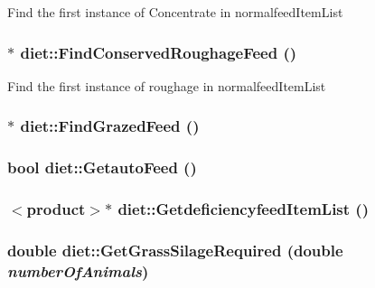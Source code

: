 \label{classdiet_a4ea8bc5fea836aedba836343ab6b5376}
Find the first instance of Concentrate in normalfeedItemList \hypertarget{classdiet_ade50672d858563540e1589b857c6d4fb}{
\subsubsection[{FindConservedRoughageFeed}]{ $\ast$ diet::FindConservedRoughageFeed ()}}
\label{classdiet_ade50672d858563540e1589b857c6d4fb}
Find the first instance of roughage in normalfeedItemList \hypertarget{classdiet_af057336f6bb49b8d919fcf4d9379d584}{
\subsubsection[{FindGrazedFeed}]{ $\ast$ diet::FindGrazedFeed ()}}
\label{classdiet_af057336f6bb49b8d919fcf4d9379d584}
\hypertarget{classdiet_a6c9fcde70c834198f2f67b361b93313b}{
\subsubsection[{GetautoFeed}]{\setlength{\rightskip}{0pt plus 5cm}bool diet::GetautoFeed ()}}
\label{classdiet_a6c9fcde70c834198f2f67b361b93313b}
\hypertarget{classdiet_afe8f51300ef50da0919c8a1b95e2cdee}{
\subsubsection[{GetdeficiencyfeedItemList}]{$<${\bf product}$>$$\ast$ diet::GetdeficiencyfeedItemList ()}}
\label{classdiet_afe8f51300ef50da0919c8a1b95e2cdee}
\hypertarget{classdiet_a78d45d92896f9dffca096c03809338be}{
\subsubsection[{GetGrassSilageRequired}]{\setlength{\rightskip}{0pt plus 5cm}double diet::GetGrassSilageRequired (double {\em numberOfAnimals})}}
